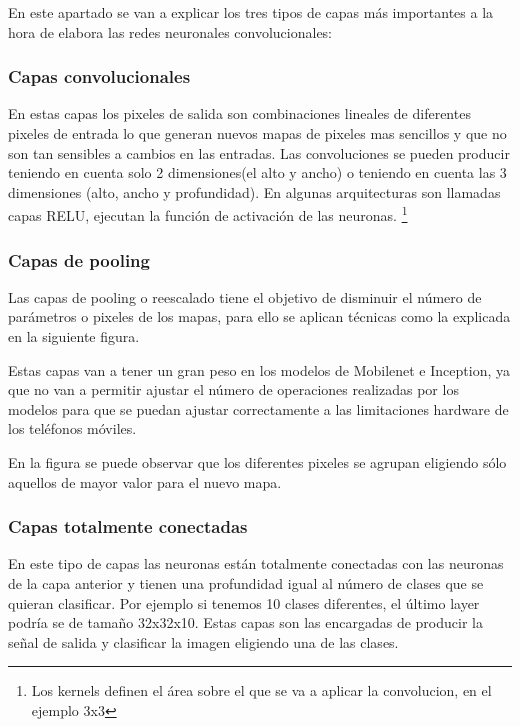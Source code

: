 En este apartado se van a explicar los tres tipos de capas más importantes a la hora de elabora las redes neuronales convolucionales:
\subsubsection{Capas convolucionales}

En estas capas los pixeles de salida son combinaciones lineales de diferentes pixeles de entrada lo que generan nuevos mapas de pixeles mas sencillos y que no son tan sensibles a cambios en las entradas. Las convoluciones se pueden producir teniendo en cuenta solo 2 dimensiones(el alto y ancho) o teniendo en cuenta las 3 dimensiones (alto, ancho y profundidad). En algunas arquitecturas son llamadas capas RELU, ejecutan la función de activación de las neuronas.
  \footnote{Los kernels definen el área sobre el que se va a aplicar la convolucion, en el ejemplo 3x3}

\subsubsection{Capas de pooling}

Las capas de pooling o reescalado tiene el objetivo de disminuir el número de parámetros o pixeles de los mapas, para ello se aplican técnicas como la explicada en la siguiente figura.

Estas capas van a tener un gran peso en los modelos de Mobilenet e Inception, ya que no van a permitir ajustar el número de operaciones realizadas por los modelos para que se puedan ajustar correctamente a las limitaciones hardware de los teléfonos móviles.


En la figura se puede observar que los diferentes pixeles se agrupan eligiendo sólo aquellos de mayor valor para el nuevo mapa.

\subsubsection{Capas totalmente conectadas}

En este tipo de capas las neuronas están totalmente conectadas con las neuronas de la capa anterior y tienen una profundidad igual al número de clases que se quieran clasificar. Por ejemplo si tenemos 10 clases diferentes, el último layer podría se de tamaño 32x32x10. Estas capas son las encargadas de producir la señal de salida y clasificar la imagen eligiendo una de las clases. 

